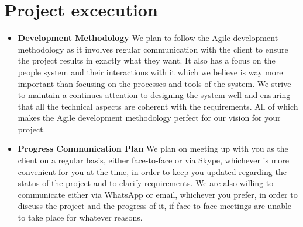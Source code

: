 \documentclass{article}
\begin{document}
	\section{Project excecution}
	\begin{itemize}
		\item \textbf{Development Methodology} \newline \newline
		We plan to follow the Agile development methodology as it involves regular communication with the client to ensure the project results in exactly what they want. It also has a focus on the people system and their interactions with it which we believe is way more important than focusing on the processes and tools of the system. We strive to maintain a continues attention to designing the system well and ensuring that all the technical aspects are coherent with the requirements. All of which makes the Agile development methodology perfect for our vision for your project.
		
		\item \textbf{Progress Communication Plan} \newline \newline
		We plan on meeting up with you as the client on a regular basis, either face-to-face or via Skype, whichever is more convenient for you at the time, in order to keep you updated regarding the status of the project and to clarify requirements. We are also willing to communicate either via WhatsApp or email, whichever you prefer, in order to discuss the project and the progress of it, if face-to-face meetings are unable to take place for whatever reasons.
	\end{itemize}
\end{document}
